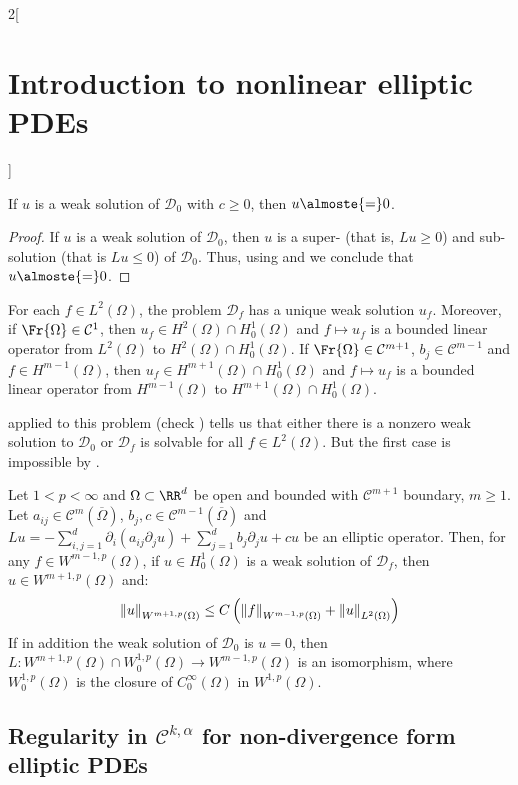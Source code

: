 \documentclass[../../../main_math.tex]{subfiles}
\begin{document}
\begin{multicols}{2}[\section{Introduction to nonlinear elliptic PDEs}]
\begin{corollary}
    If $u$ is a weak solution of $\mathcal{D}_0$ with $c\geq 0$, then $u\almoste{=}0$.
  \end{corollary}
  \begin{proof}
    If $u$ is a weak solution of $\mathcal{D}_0$, then $u$ is a super- (that is, $Lu\geq 0$) and sub-solution (that is $Lu\leq 0$) of $\mathcal{D}_0$. Thus, using  and  we conclude that $u\almoste{=}0$.
  \end{proof}
  \begin{corollary}
    For each $f\in L^2(\Omega)$, the problem $\mathcal{D}_f$ has a unique weak solution $u_f$. Moreover, if $\Fr{\Omega}\in\mathcal{C}^1$, then $u_f\in H^2(\Omega)\cap H_0^1(\Omega)$ and $f\mapsto u_f$ is a bounded linear operator from $L^2(\Omega)$ to $H^2(\Omega)\cap H_0^1(\Omega)$. If $\Fr{\Omega}\in\mathcal{C}^{m+1}$, $b_j\in\mathcal{C}^{m-1}$ and $f\in H^{m-1}(\Omega)$, then $u_f\in H^{m+1}(\Omega)\cap H_0^1(\Omega)$ and $f\mapsto u_f$ is a bounded linear operator from $H^{m-1}(\Omega)$ to $H^{m+1}(\Omega)\cap H_0^1(\Omega)$.
  \end{corollary}
  \begin{sproof}
     applied to this problem (check ) tells us that either there is a nonzero weak solution to $\mathcal{D}_0$ or $\mathcal{D}_f$ is solvable for all $f\in L^2(\Omega)$. But the first case is impossible by .
  \end{sproof}
  \begin{theorem}
    Let $1<p<\infty$ and $\Omega\subset\RR^d$ be open and bounded with $\mathcal{C}^{m+1}$ boundary, $m\geq 1$. Let $a_{ij}\in \mathcal{C}^m(\overline{\Omega})$, $b_j,c\in \mathcal{C}^{m-1}(\overline{\Omega})$ and $Lu=-\sum_{i,j=1}^d \partial_i(a_{ij}\partial_j u)+\sum_{j=1}^d b_j\partial_j u+cu$ be an elliptic operator. Then, for any $f\in W^{m-1,p}(\Omega)$, if $u\in H^1_0(\Omega)$ is a weak solution of $\mathcal{D}_f$, then $u\in W^{m+1,p}(\Omega)$ and:
    $$
      \norm{u}_{W^{m+1,p}(\Omega)}\leq C\left(\norm{f}_{W^{m-1,p}(\Omega)}+\norm{u}_{L^2(\Omega)}\right)
    $$
    If in addition the weak solution of $\mathcal{D}_0$ is $u=0$, then $L:W^{m+1,p}(\Omega)\cap W_0^{1,p}(\Omega)\to W^{m-1,p}(\Omega)$ is an isomorphism, where $W_0^{1,p}(\Omega)$ is the closure of $C_0^\infty(\Omega)$ in $W^{1,p}(\Omega)$.
  \end{theorem}
  \subsection{Regularity in \texorpdfstring{$\mathcal{C}^{k,\alpha}$}{Ckalpha} for non-divergence form elliptic PDEs}


\end{multicols}
\end{document}
